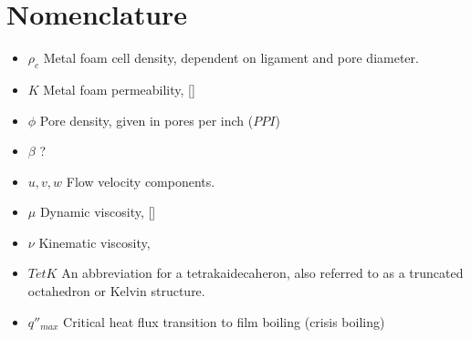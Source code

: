\documentclass[compileTAMUreport.tex]{subfiles}
\begin{document}
\section{Nomenclature}

\begin{itemize}
\item $\rho_c$ Metal foam cell density, dependent on ligament and pore diameter.
\item $K$ Metal foam permeability, [\metre\squared]
\item $\phi$ Pore density, given in pores per inch ($PPI$) 
\item $\beta$ ?
\item $u,v,w$ Flow  velocity components.
\item $\mu$ Dynamic viscosity, [\newton\second\per\meter\squared ]
\item $\nu$ Kinematic viscosity, \metre\per\second\squared
\item $TetK$ An abbreviation for a tetrakaidecaheron, also referred to as a truncated octahedron or Kelvin structure.
\item $q''_{max}$ Critical heat flux transition to film boiling (crisis boiling)
\end{itemize}
\end{document}
